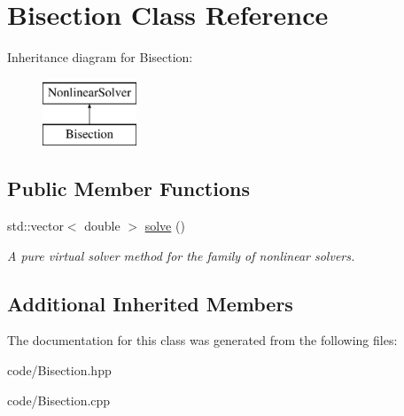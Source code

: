 \hypertarget{class_bisection}{}\section{Bisection Class Reference}
\label{class_bisection}
Inheritance diagram for Bisection\+:\begin{figure}[H]
\begin{center}
\leavevmode
\includegraphics[height=2.000000cm]{class_bisection}
\end{center}
\end{figure}
\subsection*{Public Member Functions}
\begin{DoxyCompactItemize}
\item 
std\+::vector$<$ double $>$ \hyperlink{class_bisection_a745b39896b95c5e3360d91a85718ae2d}{solve} ()\hypertarget{class_bisection_a745b39896b95c5e3360d91a85718ae2d}{}\label{class_bisection_a745b39896b95c5e3360d91a85718ae2d}

\begin{DoxyCompactList}\small\item\em A pure virtual solver method for the family of nonlinear solvers. \end{DoxyCompactList}\end{DoxyCompactItemize}
\subsection*{Additional Inherited Members}


The documentation for this class was generated from the following files\+:\begin{DoxyCompactItemize}
\item 
code/Bisection.\+hpp\item 
code/Bisection.\+cpp\end{DoxyCompactItemize}
